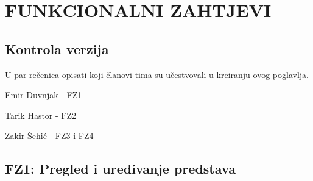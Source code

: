 \sloppy
\chapter{FUNKCIONALNI ZAHTJEVI}

\sloppy
\section*{Kontrola verzija}

U par rečenica opisati koji članovi tima su učestvovali u kreiranju ovog poglavlja.

\noindent Emir Duvnjak - FZ1

\noindent Tarik Hastor - FZ2

\noindent Zakir Šehić - FZ3 i FZ4


\sloppy  
\section{FZ1: Pregled i uređivanje predstava}  

\sloppy  
